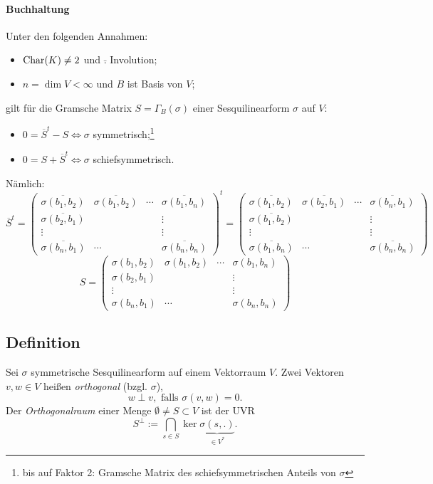 \paragraph{Buchhaltung}
	Unter den folgenden Annahmen:
		\begin{itemize}
			\item $ \operatorname{Char}(K)\neq 2 $ und $ \bar{.} $ Involution;
			\item $ n=\dim V <\infty $ und $ B $ ist Basis von $ V $;
		\end{itemize}
	gilt für die Gramsche Matrix $ S = \Gamma_B(\sigma) $ einer Sesquilinearform $ \sigma $ auf $ V $:
		\begin{itemize}
			\item $ 0 = \overline{S}^t-S\Leftrightarrow \sigma $ symmetrisch;\footnote{bis auf Faktor 2: Gramsche Matrix des schiefsymmetrischen Anteils von $ \sigma $}
			\item $ 0 = S + \overline{S}^t \Leftrightarrow \sigma $ schiefsymmetrisch.
		\end{itemize}
	Nämlich:
		\[ \overline{S}^t = \begin{pmatrix}
		\overline{\sigma(b_1,b_2)} & \overline{\sigma(b_1,b_2)} &\cdots& \overline{\sigma(b_1,b_n)} \\ 
		\overline{\sigma(b_2,b_1)} &  & & \vdots \\ 
		\vdots &  & & \vdots \\ 
		\overline{\sigma(b_n,b_1)} & \cdots & & \overline{\sigma(b_n,b_n)}
		\end{pmatrix}^t =  \begin{pmatrix}
		\overline{\sigma(b_1,b_2)} & \overline{\sigma(b_2,b_1)} &\cdots& \overline{\sigma(b_n,b_1)} \\ 
		\overline{\sigma(b_1,b_2)} &  & & \vdots \\ 
		\vdots &  & & \vdots \\ 
		\overline{\sigma(b_1,b_n)} & \cdots & & \overline{\sigma(b_n,b_n)}
		\end{pmatrix} \]
		\[ S = \begin{pmatrix}
		\sigma(b_1,b_2) & \sigma(b_1,b_2) &\cdots& \sigma(b_1,b_n) \\ 
		\sigma(b_2,b_1) &  & & \vdots \\ 
		\vdots &  & & \vdots \\ 
		\sigma(b_n,b_1) & \cdots & & \sigma(b_n,b_n)
		\end{pmatrix} \]
		
\subsection{Definition} 
\begin{Definition}
	Sei $ \sigma $ symmetrische Sesquilinearform auf einem Vektorraum $ V $. Zwei Vektoren $ v,w\in V $ heißen \emph{orthogonal} (bzgl. $ \sigma $),
		\[ w \perp v, \text{ falls } \sigma(v,w) = 0. \]
	Der \emph{Orthogonalraum} einer Menge $ \emptyset \neq S\subset V $ ist der UVR
		\[ S^\perp := \bigcap_{s\in S} \ker \underset{\in V^*}{\underbrace{\sigma(s,.)}}. \]
\end{Definition}
